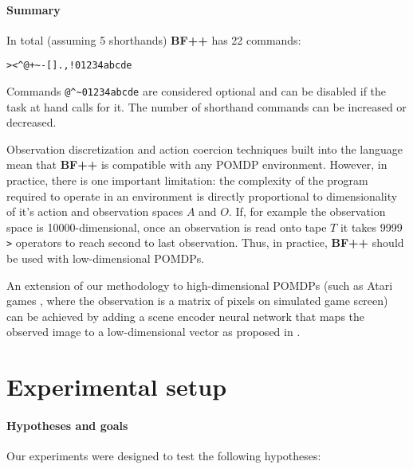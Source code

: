 \paragraph{Summary}
\label{sec:summary}

In total (assuming 5 shorthands) \textbf{BF++} has 22 commands:

\begin{center}
\begin{lstlisting}
><^@+~-[].,!01234abcde
\end{lstlisting}
\end{center}

Commands \verb|@^~01234abcde| are considered optional and can be disabled if the task at hand calls for it.
The number of shorthand commands can be increased or decreased.

Observation discretization and action coercion techniques built into the language mean that \textbf{BF++} is compatible with any POMDP environment. 
However, in practice, there is one important limitation: the complexity of the program required to operate in an environment is directly proportional to dimensionality of it's action and observation spaces $A$ and $O$. 
If, for example the observation space is 10000-dimensional, once an observation is read onto tape $T$ it takes 9999 \verb|>| operators to reach second to last observation.
Thus, in practice, \textbf{BF++} should be used with low-dimensional POMDPs.

An extension of our methodology to high-dimensional POMDPs (such as Atari games \cite{atari}, where the observation is a matrix of pixels on simulated game screen) can be achieved by adding a scene encoder neural network that maps the observed image to a low-dimensional vector as proposed in \cite{daqn}.

\newpage
\section{Experimental setup}
\label{sec:bfpp-experiments}

\paragraph{Hypotheses and goals}
\label{sec:exgoals}

Our experiments were designed to test the following hypotheses:

